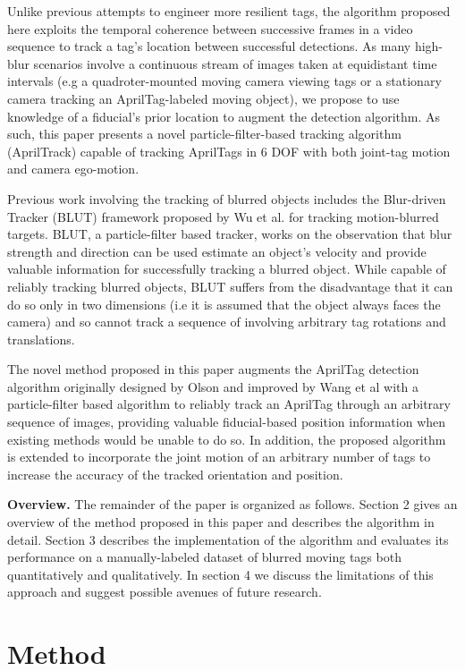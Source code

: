 \documentclass[letterpaper, 10 pt, conference]{ieeeconf}
\begin{document}
Unlike previous attempts to engineer more resilient tags, the algorithm proposed here exploits the temporal coherence between successive frames in a video sequence to track a tag's location between successful detections. As many high-blur scenarios involve a continuous stream of images taken at equidistant time intervals (e.g a quadroter-mounted moving camera viewing tags or a stationary camera tracking an AprilTag-labeled moving object), we propose to use knowledge of a fiducial's prior location to augment the detection algorithm. As such, this paper presents a novel particle-filter-based tracking algorithm (AprilTrack) capable of tracking AprilTags in 6 DOF with both joint-tag motion and camera ego-motion.
	
Previous work involving the tracking of blurred objects includes the Blur-driven Tracker (BLUT) framework proposed by Wu et al. \cite{BLUT} for tracking motion-blurred targets. BLUT, a particle-filter based tracker, works on the observation that blur strength and direction can be used estimate an object's velocity and provide valuable information for successfully tracking a blurred object. While capable of reliably tracking blurred objects, BLUT suffers from the disadvantage that it can do so only in two dimensions (i.e it is assumed that the object always faces the camera) and so cannot track a sequence of involving arbitrary tag rotations and translations.


The novel method proposed in this paper augments the AprilTag detection algorithm originally designed by Olson \cite{AprilTag} and improved by Wang et al \cite{AprilTag_2} with a particle-filter based algorithm to reliably track an AprilTag through an arbitrary sequence of images, providing valuable fiducial-based position information when existing methods would be unable to do so. In addition, the proposed algorithm is extended to incorporate the joint motion of an arbitrary number of tags to increase the accuracy of the tracked orientation and position.


\textbf{Overview.} The remainder of the paper is organized as follows. Section 2 gives an overview of the method proposed in this paper and describes the algorithm in detail. Section 3 describes the implementation of the algorithm and evaluates its performance on a manually-labeled dataset of blurred moving tags both quantitatively and qualitatively. In section 4 we discuss the limitations of this approach and suggest possible avenues of future research.

\section{Method}
\end{document}
